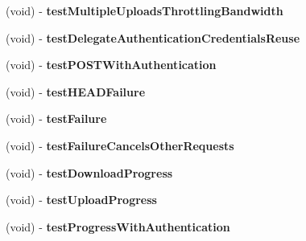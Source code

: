 \begin{DoxyCompactItemize}
\item 
\hypertarget{interface_a_s_i_network_queue_tests_a3c936cbdc4d5d95c086acccc6b61a277}{
(void) -\/ {\bfseries test\-Multiple\-Uploads\-Throttling\-Bandwidth}}
\label{interface_a_s_i_network_queue_tests_a3c936cbdc4d5d95c086acccc6b61a277}

\item 
\hypertarget{interface_a_s_i_network_queue_tests_ad451f41961e411ca4e0a493564f3782e}{
(void) -\/ {\bfseries test\-Delegate\-Authentication\-Credentials\-Reuse}}
\label{interface_a_s_i_network_queue_tests_ad451f41961e411ca4e0a493564f3782e}

\item 
\hypertarget{interface_a_s_i_network_queue_tests_aa73ecf9606cf1826f4137aef4ff343be}{
(void) -\/ {\bfseries test\-P\-O\-S\-T\-With\-Authentication}}
\label{interface_a_s_i_network_queue_tests_aa73ecf9606cf1826f4137aef4ff343be}

\item 
\hypertarget{interface_a_s_i_network_queue_tests_aa50e545358ffc84eea2a4f61e6d782eb}{
(void) -\/ {\bfseries test\-H\-E\-A\-D\-Failure}}
\label{interface_a_s_i_network_queue_tests_aa50e545358ffc84eea2a4f61e6d782eb}

\item 
\hypertarget{interface_a_s_i_network_queue_tests_a676be0402a758bbd669e8b11f7bb368d}{
(void) -\/ {\bfseries test\-Failure}}
\label{interface_a_s_i_network_queue_tests_a676be0402a758bbd669e8b11f7bb368d}

\item 
\hypertarget{interface_a_s_i_network_queue_tests_a1d3ea45df0ebc0597e234c1a2fa3c35b}{
(void) -\/ {\bfseries test\-Failure\-Cancels\-Other\-Requests}}
\label{interface_a_s_i_network_queue_tests_a1d3ea45df0ebc0597e234c1a2fa3c35b}

\item 
\hypertarget{interface_a_s_i_network_queue_tests_a59b48bbf964a2a4ac6626270d519748a}{
(void) -\/ {\bfseries test\-Download\-Progress}}
\label{interface_a_s_i_network_queue_tests_a59b48bbf964a2a4ac6626270d519748a}

\item 
\hypertarget{interface_a_s_i_network_queue_tests_a75e8fb03b62a4a3c8be34b64407c508a}{
(void) -\/ {\bfseries test\-Upload\-Progress}}
\label{interface_a_s_i_network_queue_tests_a75e8fb03b62a4a3c8be34b64407c508a}

\item 
\hypertarget{interface_a_s_i_network_queue_tests_aa1ec111c87e8672ac36cf638d41acb23}{
(void) -\/ {\bfseries test\-Progress\-With\-Authentication}}
\label{interface_a_s_i_network_queue_tests_aa1ec111c87e8672ac36cf638d41acb23}


\end{DoxyCompactItemize}
